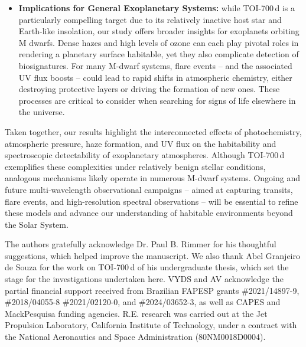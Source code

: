\begin{itemize}
\item \textbf{Implications for General Exoplanetary Systems:} while TOI-700\,d is a particularly compelling target due to its relatively inactive host star and Earth-like insolation, our study offers broader insights for exoplanets orbiting M dwarfs. Dense hazes and high levels of ozone can each play pivotal roles in rendering a planetary surface habitable, yet they also complicate detection of biosignatures. For many M-dwarf systems, flare events -- and the associated UV flux boosts -- could lead to rapid shifts in atmospheric chemistry, either destroying protective layers or driving the formation of new ones. These processes are critical to consider when searching for signs of life elsewhere in the universe.

\end{itemize}

Taken together, our results highlight the interconnected effects of photochemistry, atmospheric pressure, haze formation, and UV flux on the habitability and spectroscopic detectability of exoplanetary atmospheres. Although TOI-700\,d exemplifies these complexities under relatively benign stellar conditions, analogous mechanisms likely operate in numerous M-dwarf systems. Ongoing and future multi-wavelength observational campaigns -- aimed at capturing transits, flare events, and high-resolution spectral observations -- will be essential to refine these models and advance our understanding of habitable environments beyond the Solar System.

\begin{acknowledgments}
\small
The authors gratefully acknowledge Dr. Paul B. Rimmer for his thoughtful suggestions, which helped improve the manuscript.
We also thank Abel Granjeiro de Souza for the work on TOI-700\,d of his undergraduate thesis, which set the stage for the investigations undertaken here. 
VYDS and AV acknowledge the partial financial support received from Brazilian FAPESP grants \#2021/14897-9, \#2018/04055-8 \#2021/02120-0, and \#2024/03652-3, as well as CAPES and MackPesquisa funding agencies. R.E. research was carried out at the Jet Propulsion Laboratory, California Institute of Technology, under a contract with the National Aeronautics and Space Administration (80NM0018D0004).
\end{acknowledgments}


